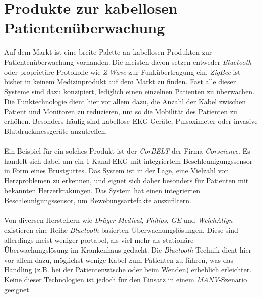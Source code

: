 \section{Produkte zur kabellosen Patientenüberwachung}\label{produkte_zur_patientenueberwachung}
Auf dem Markt ist eine breite Palette an kabellosen Produkten zur Patientenüberwachung vorhanden. Die meisten davon setzen
entweder \emph{Bluetooth} oder proprietäre Protokolle wie \emph{Z-Wave} zur Funkübertragung ein, \emph{ZigBee} ist bisher in
keinem Medizinprodukt auf dem Markt zu finden. Fast alle dieser Systeme sind dazu konzipiert, lediglich einen einzelnen 
Patienten zu überwachen. Die Funktechnologie dient hier vor allem dazu, die Anzahl der Kabel zwischen Patient und Monitoren 
zu reduzieren, um so die Mobilität des Patienten zu erhöhen. Besonders häufig sind kabellose EKG-Geräte, Pulsoximeter oder 
invasive Blutdruckmessgeräte anzutreffen. \\
\\             
Ein Beispiel für ein solches Produkt ist der \emph{CorBELT} der Firma \emph{Corscience}. Es handelt sich dabei
um ein 1-Kanal EKG mit integriertem Beschleunigungssensor in Form eines Brustgurtes. Das System ist in der
Lage, eine Vielzahl von Herzproblemen zu erkennen, und eignet sich daher besonders für Patienten mit bekannten
Herzerkrakungen. Das System hat einen integrierten Beschleunigungssensor, um Bewebungsartefakte auszufiltern.
\\
\\
Von diversen Herstellern wie \emph{Dräger Medical}, \emph{Philips}, \emph{GE} und \emph{WelchAllyn} existieren eine 
Reihe \emph{Bluetooth} basierten Überwachungslösungen. Diese sind allerdings meist weniger portabel, als viel mehr
als stationäre Überwachungslösung im Krankenhaus gedacht. Die \emph{Bluetooth}-Technik dient hier vor allem dazu, 
möglichst wenige Kabel zum Patienten zu führen, was das Handling (z.B. bei der Patientenwäsche oder beim Wenden)
erheblich erleichter. Keine dieser Technologien ist jedoch für den Einsatz in einem \emph{MANV}-Szenario
geeignet.
       

